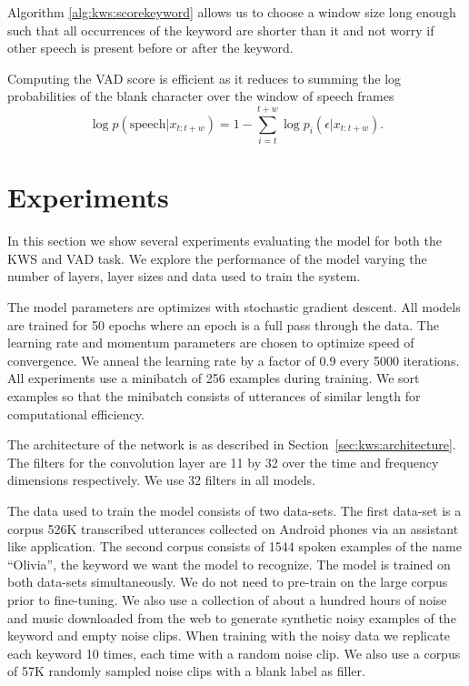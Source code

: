 Algorithm \ref{alg:kws:scorekeyword} allows us to choose a window size long
enough such that all occurrences of the keyword are shorter than it and not
worry if other speech is present before or after the keyword.

Computing the VAD score is efficient as it reduces to summing the log
probabilities of the blank character over the window of speech frames
\begin{equation}
\log p(\mathrm{speech}| x_{t:t+w}) = 1 - \sum_{i=t}^{t + w} \log p_i(\epsilon | x_{t:t+w}).
\end{equation}

\section{Experiments}
\label{sec:kws:experiments}

In this section we show several experiments evaluating the model for both the
KWS and VAD task. We explore the performance of the model varying the number of
layers, layer sizes and data used to train the system.

The model parameters are optimizes with stochastic gradient descent. All models
are trained for 50 epochs where an epoch is a full pass through the data. The
learning rate and momentum parameters are chosen to optimize speed of
convergence. We anneal the learning rate by a factor of 0.9 every 5000
iterations. All experiments use a minibatch of 256 examples during training. We
sort examples so that the minibatch consists of utterances of similar length
for computational efficiency. 

The architecture of the network is as described in
Section~\ref{sec:kws:architecture}. The filters for the convolution layer are
11 by 32 over the time and frequency dimensions respectively. We use 32 filters
in all models.

The data used to train the model consists of two data-sets. The first data-set
is a corpus 526K transcribed utterances collected on Android phones via an
assistant like application. The second corpus consists of 1544 spoken examples
of the name ``Olivia'', the keyword we want the model to recognize. The model
is trained on both data-sets simultaneously. We do not need to pre-train on the
large corpus prior to fine-tuning. We also use a collection of about a hundred
hours of noise and music downloaded from the web to generate synthetic noisy
examples of the keyword and empty noise clips. When training with the noisy
data we replicate each keyword 10 times, each time with a random noise clip. We
also use a corpus of 57K randomly sampled noise clips with a blank label as
filler.

